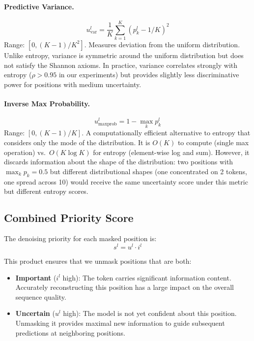 \paragraph{Predictive Variance.}
\begin{equation}
    u^l_{\text{var}} = \frac{1}{K} \sum_{k=1}^K (p^l_k - 1/K)^2
\end{equation}
Range: $[0, (K{-}1)/K^2]$. Measures deviation from the uniform distribution. Unlike entropy, variance is symmetric around the uniform distribution but does not satisfy the Shannon axioms. In practice, variance correlates strongly with entropy ($\rho > 0.95$ in our experiments) but provides slightly less discriminative power for positions with medium uncertainty.

\paragraph{Inverse Max Probability.}
\begin{equation}
    u^l_{\text{maxprob}} = 1 - \max_k p^l_k
\end{equation}
Range: $[0, (K{-}1)/K]$. A computationally efficient alternative to entropy that considers only the mode of the distribution. It is $O(K)$ to compute (single max operation) vs.\ $O(K \log K)$ for entropy (element-wise log and sum). However, it discards information about the shape of the distribution: two positions with $\max_k p_k = 0.5$ but different distributional shapes (one concentrated on 2 tokens, one spread across 10) would receive the same uncertainty score under this metric but different entropy scores.

\subsection{Combined Priority Score}

The denoising priority for each masked position is:
\begin{equation}
    s^l = u^l \cdot i^l
\end{equation}

This product ensures that we unmask positions that are both:
\begin{itemize}[leftmargin=*,itemsep=2pt]
    \item \textbf{Important} ($i^l$ high): The token carries significant information content. Accurately reconstructing this position has a large impact on the overall sequence quality.
    \item \textbf{Uncertain} ($u^l$ high): The model is not yet confident about this position. Unmasking it provides maximal new information to guide subsequent predictions at neighboring positions.
\end{itemize}

